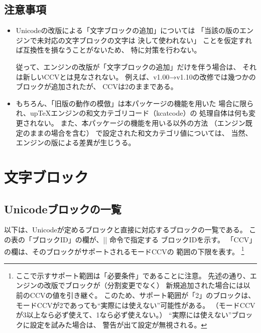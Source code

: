 \documentclass[uplatex,dvipdfmx,a4paper]{jsarticle}
\providecommand{\pTeX}{p\TeX}
\providecommand{\upTeX}{u\pTeX}
\begin{document}
\subsection{注意事項}

\begin{itemize}
\item Unicodeの改版による「文字ブロックの追加」については
  「当該の版のエンジンで未対応の文字ブロックの文字は
  決して使われない」
  ことを仮定すれば互換性を損なうことがないため、
  特に対策を行わない。

  従って、エンジンの改版が「文字ブロックの追加」だけを伴う場合は、
  それは新しいCCVとは見なされない。
  例えば、v1.00→v1.10の改修では幾つかのブロックが追加されたが、
  CCVは2のままである。

\item もちろん、「旧版の動作の模倣」は本パッケージの機能を用いた
  場合に限られ、{\upTeX}エンジンの和文カテゴリコード（kcatcode）の
  処理自体は何も変更されない。
  また、本パッケージの機能を用いる以外の方法
  （エンジン既定のままの場合を含む）
  で設定された和文カテゴリ値については、
  当然、エンジンの版による差異が生じうる。

\end{itemize}


\section{文字ブロック}
\label{sec:Blocks}

\subsection{Unicodeブロックの一覧}

以下は、Unicodeが定めるブロックと直接に対応するブロックの一覧である。
この表の「ブロックID」の欄が、|\cjkcategory| 命令で指定する
ブロックIDを示す。
「CCV」の欄は、そのブロックがサポートされるモードCCVの
範囲の下限を表す。
\footnote{ここで示すサポート範囲は「必要条件」であることに注意。
  先述の通り、エンジンの改版でブロックが（分割変更でなく）
  新規追加された場合には以前のCCVの値を引き継ぐ。
  このため、サポート範囲が「2」のブロックは、
  モードCCVが2であっても“実際には使えない”可能性がある。
  （モードCCVが3以上なら必ず使えて、1なら必ず使えない。）
  “実際には使えない”ブロックに設定を試みた場合は、
  警告が出て設定が無視される。}
\end{document}
